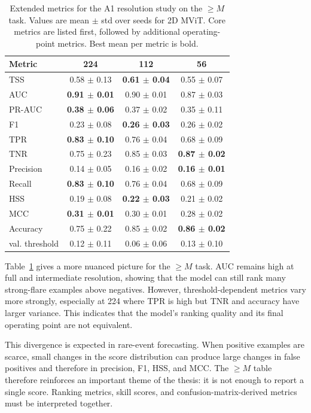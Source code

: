 \begin{table}[!htbp]
\centering
\footnotesize
\setlength{\tabcolsep}{4pt}
\caption{Extended metrics for the A1 resolution study on the $\geq M$ task. Values are mean $\pm$ std over seeds for 2D MViT. Core metrics are listed first, followed by additional operating-point metrics. Best mean per metric is bold.}
\label{tab:appendix_res_m}
\begin{tabular}{lccc}
\toprule
Metric & 224 & 112 & 56 \\
\midrule
TSS & 0.58 $\pm$ 0.13 & \textbf{0.61 $\pm$ 0.04} & 0.55 $\pm$ 0.07 \\
AUC & \textbf{0.91 $\pm$ 0.01} & 0.90 $\pm$ 0.01 & 0.87 $\pm$ 0.03 \\
PR-AUC & \textbf{0.38 $\pm$ 0.06} & 0.37 $\pm$ 0.02 & 0.35 $\pm$ 0.11 \\
F1 & 0.23 $\pm$ 0.08 & \textbf{0.26 $\pm$ 0.03} & 0.26 $\pm$ 0.02 \\
TPR & \textbf{0.83 $\pm$ 0.10} & 0.76 $\pm$ 0.04 & 0.68 $\pm$ 0.09 \\
TNR & 0.75 $\pm$ 0.23 & 0.85 $\pm$ 0.03 & \textbf{0.87 $\pm$ 0.02} \\
Precision & 0.14 $\pm$ 0.05 & 0.16 $\pm$ 0.02 & \textbf{0.16 $\pm$ 0.01} \\
Recall & \textbf{0.83 $\pm$ 0.10} & 0.76 $\pm$ 0.04 & 0.68 $\pm$ 0.09 \\
HSS & 0.19 $\pm$ 0.08 & \textbf{0.22 $\pm$ 0.03} & 0.21 $\pm$ 0.02 \\
MCC & \textbf{0.31 $\pm$ 0.01} & 0.30 $\pm$ 0.01 & 0.28 $\pm$ 0.02 \\
Accuracy & 0.75 $\pm$ 0.22 & 0.85 $\pm$ 0.02 & \textbf{0.86 $\pm$ 0.02} \\
val. threshold & 0.12 $\pm$ 0.11 & 0.06 $\pm$ 0.06 & 0.13 $\pm$ 0.10 \\
\bottomrule
\end{tabular}
\end{table}

\FloatBarrier

Table~\ref{tab:appendix_res_m} gives a more nuanced picture for the $\geq M$ task. AUC remains high at full and intermediate resolution, showing that the model can still rank many strong-flare examples above negatives. However, threshold-dependent metrics vary more strongly, especially at 224 where TPR is high but TNR and accuracy have larger variance. This indicates that the model's ranking quality and its final operating point are not equivalent.

This divergence is expected in rare-event forecasting. When positive examples are scarce, small changes in the score distribution can produce large changes in false positives and therefore in precision, F1, HSS, and MCC. The $\geq M$ table therefore reinforces an important theme of the thesis: it is not enough to report a single score. Ranking metrics, skill scores, and confusion-matrix-derived metrics must be interpreted together.

